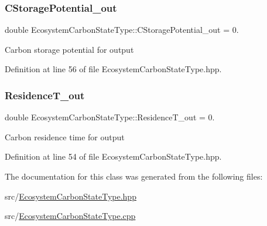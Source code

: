 \subsubsection{\texorpdfstring{C\+Storage\+Potential\+\_\+out}{CStoragePotential\_out}}
{\footnotesize\ttfamily double Ecosystem\+Carbon\+State\+Type\+::\+C\+Storage\+Potential\+\_\+out = 0.}

Carbon storage potential for output 

Definition at line 56 of file Ecosystem\+Carbon\+State\+Type.\+hpp.

\mbox{\label{class_ecosystem_carbon_state_type_aa98b5ed995c5f549c37d4131487d5707}} 
\subsubsection{\texorpdfstring{Residence\+T\+\_\+out}{ResidenceT\_out}}
{\footnotesize\ttfamily double Ecosystem\+Carbon\+State\+Type\+::\+Residence\+T\+\_\+out = 0.}

Carbon residence time for output 

Definition at line 54 of file Ecosystem\+Carbon\+State\+Type.\+hpp.



The documentation for this class was generated from the following files\+:\begin{DoxyCompactItemize}
\item 
src/\mbox{\hyperlink{_ecosystem_carbon_state_type_8hpp}{Ecosystem\+Carbon\+State\+Type.\+hpp}}\item 
src/\mbox{\hyperlink{_ecosystem_carbon_state_type_8cpp}{Ecosystem\+Carbon\+State\+Type.\+cpp}}\end{DoxyCompactItemize}
